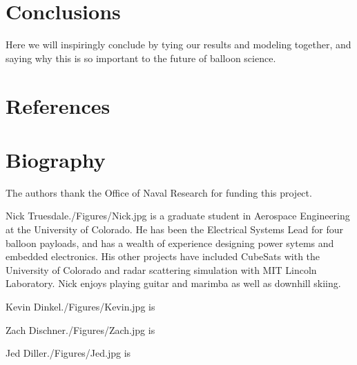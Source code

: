 \documentclass[twocolumn,letterpaper]{IEEEAerospace2012}
\newcommand{\rootdir}{./Figures/}
\begin{document}
  

\section{Conclusions}
Here we will inspiringly conclude by tying our results and modeling together, and saying why this is so important to the future of balloon science.

\section{References}


\section{Biography}

\appendices

\acknowledgments
The authors thank the Office of Naval Research for funding this project.


\thebiography
\begin{biographywithjpg} 
{Nick Truesdale}{\rootdir Nick.jpg}
is a graduate student in Aerospace Engineering at the University of Colorado.
He has been the Electrical Systems Lead for four balloon payloads, and has a wealth of experience designing power sytems and embedded electronics. His other projects have included CubeSats with the University of Colorado and radar scattering simulation with MIT Lincoln Laboratory. Nick enjoys playing guitar and marimba as well as downhill skiing.   
\end{biographywithjpg}

\begin{biographywithjpg}{Kevin Dinkel}{\rootdir Kevin.jpg}
is
\end{biographywithjpg}

\begin{biographywithjpg}{Zach Dischner}{\rootdir Zach.jpg}
is
\end{biographywithjpg}

\begin{biographywithjpg}{Jed Diller}{\rootdir Jed.jpg}
is
\end{biographywithjpg}
\end{document}
